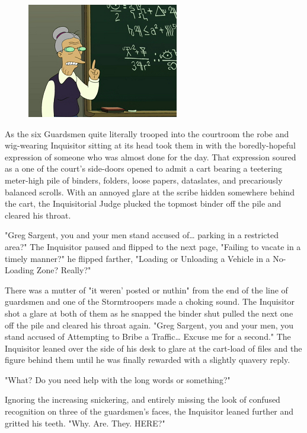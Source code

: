 \begin{figure}
	\begin{center}
		\includegraphics[width=\figwidth]{pics/21/2.png}
	\end{center}
\end{figure}
As the six Guardsmen quite literally trooped into the courtroom the robe and wig-wearing Inquisitor sitting at its head took them in with the boredly-hopeful expression of someone who was almost done for the day. 
That expression soured as a one of the court's side-doors opened to admit a cart bearing a teetering meter-high pile of binders, folders, loose papers, dataslates, and precariously balanced scrolls. 
With an annoyed glare at the scribe hidden somewhere behind the cart, the Inquisitorial Judge plucked the topmost binder off the pile and cleared his throat.

"Greg Sargent, you and your men stand accused of… parking in a restricted area?" The Inquisitor paused and flipped to the next page, "Failing to vacate in a timely manner?" he flipped farther, "Loading or Unloading a Vehicle in a No-Loading Zone? 
Really?" 

There was a mutter of "it weren' posted or nuthin" from the end of the line of guardsmen and one of the Stormtroopers made a choking sound. 
The Inquisitor shot a glare at both of them as he snapped the binder shut pulled the next one off the pile and cleared his throat again. 
"Greg Sargent, you and your men, you stand accused of Attempting to Bribe a Traffic… Excuse me for a second." The Inquisitor leaned over the side of his desk to glare at the cart-load of files and the figure behind them until he was finally rewarded with a slightly quavery reply. 


"What? 
Do you need help with the long words or something?" 

Ignoring the increasing snickering, and entirely missing the look of confused recognition on three of the guardsmen's faces, the Inquisitor leaned further and gritted his teeth. 
"Why. 
Are. 
They. 
HERE?"

